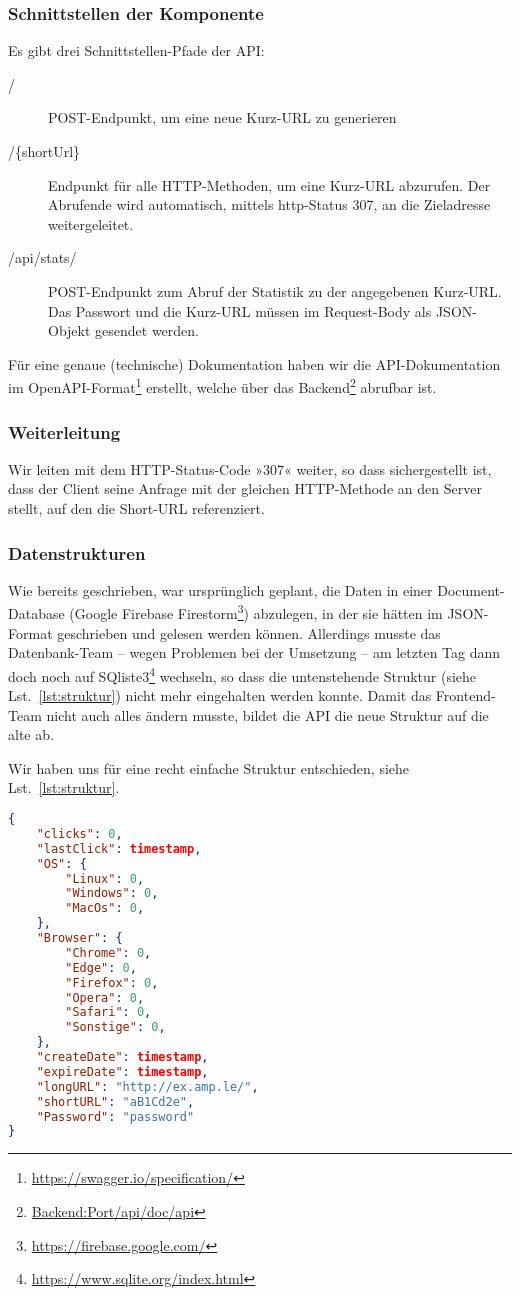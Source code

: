 \documentclass[a4paper,11pt,DIV=12,overfullrule=on]{scrreprt}%
\begin{document}
\subsubsection{Schnittstellen der Komponente}
Es gibt drei Schnittstellen-Pfade der \ac{API}:
\begin{description}
    \item[/] POST-Endpunkt, um eine neue Kurz-\ac{URL} zu generieren
    \item[/\{shortUrl\}] Endpunkt für alle HTTP-Methoden, um eine Kurz-\ac{URL} abzurufen. Der Abrufende wird automatisch, mittels http-Status 307, an die Zieladresse weitergeleitet.
    \item[/api/stats/] POST-Endpunkt zum Abruf der Statistik zu der angegebenen Kurz-\ac{URL}. Das Passwort und die Kurz-\ac{URL} müssen im Request-Body als \ac{JSON}-Objekt gesendet werden.
\end{description}
Für eine genaue (technische) Dokumentation haben wir die \ac{API}-Dokumentation im OpenAPI-Format\footnote{\href{https://swagger.io/specification/}{https://swagger.io/specification/}} erstellt, welche über das Backend\footnote{\href{http://localhost:8080/api/doc/api}{Backend:Port/api/doc/api}} abrufbar ist.
\subsubsection{Weiterleitung}
Wir leiten mit dem HTTP-Status-Code »307« weiter, so dass sichergestellt ist, dass der Client seine Anfrage mit der gleichen HTTP-Methode an den Server stellt, auf den die Short-\ac{URL} referenziert.
\subsubsection{Datenstrukturen}
Wie bereits geschrieben, war ursprünglich geplant, die Daten in einer Document-Database (Google Firebase Firestorm\footnote{\href{https://firebase.google.com/}{https://firebase.google.com/}}) abzulegen, in der sie hätten im \ac{JSON}-Format geschrieben und gelesen werden können. Allerdings musste das Datenbank-Team – wegen Problemen bei der Umsetzung – am letzten Tag dann doch noch auf SQliste3\footnote{\href{https://www.sqlite.org/index.html}{https://www.sqlite.org/index.html}} wechseln, so dass die untenstehende Struktur (siehe Lst.~\ref{lst:struktur}) nicht mehr eingehalten werden konnte. Damit das Frontend-Team nicht auch alles ändern musste, bildet die \ac{API} die neue Struktur auf die alte ab.

Wir haben uns für eine recht einfache Struktur entschieden, siehe Lst.~\ref{lst:struktur}.
\begin{lstlisting}[language=json,
    float=h,
    caption={Aufbau der Datenstruktur für jede Kurz-Url},
    label={lst:struktur}]
{
    "clicks": 0,
    "lastClick": timestamp,
    "OS": {
        "Linux": 0,
        "Windows": 0,
        "MacOs": 0,
    },
    "Browser": {
        "Chrome": 0,
        "Edge": 0,
        "Firefox": 0,
        "Opera": 0,
        "Safari": 0,
        "Sonstige": 0,
    },
    "createDate": timestamp,
    "expireDate": timestamp,
    "longURL": "http://ex.amp.le/",
    "shortURL": "aB1Cd2e",
    "Password": "password"
}
\end{lstlisting}
\end{document}
